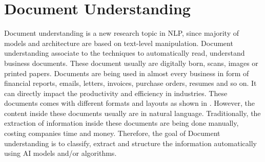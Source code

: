 \section{Document Understanding}

Document understanding is a new research topic in NLP, since majority of models and architecture are based on text-level manipulation. Document understanding associate to the techniques to automatically read, understand business documents. These document usually are digitally born, scans, images or printed papers. Documents are being used in almost every business in form of financial reports, emails, letters, invoices, purchase orders, resumes and so on. It can directly impact the productivity and efficiency in industries. These documents comes with different formats and layouts as shown in . However, the content inside these documents usually are in natural language. Traditionally, the extraction of information inside these documents are being done manually, costing companies time and money. Therefore, the goal of Document understanding is to classify, extract and structure the information automatically using AI models and/or algorithms. 


